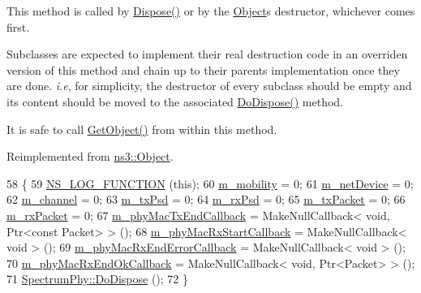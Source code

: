 This method is called by \hyperlink{classns3_1_1Object_aa90ae598863f6c251cdab3c3722afdaf}{Dispose()} or by the \hyperlink{classns3_1_1Object}{Object}\textquotesingle{}s destructor, whichever comes first.

Subclasses are expected to implement their real destruction code in an overriden version of this method and chain up to their parent\textquotesingle{}s implementation once they are done. {\itshape i.\+e}, for simplicity, the destructor of every subclass should be empty and its content should be moved to the associated \hyperlink{classns3_1_1HalfDuplexIdealPhy_a94c4dd0e18bc6c4999d75d65ef80c27e}{Do\+Dispose()} method.

It is safe to call \hyperlink{classns3_1_1Object_a13e18c00017096c8381eb651d5bd0783}{Get\+Object()} from within this method. 

Reimplemented from \hyperlink{classns3_1_1Object_a475d429a75d302d4775f4ae32479b287}{ns3\+::\+Object}.


\begin{DoxyCode}
58 \{
59   \hyperlink{log-macros-disabled_8h_a90b90d5bad1f39cb1b64923ea94c0761}{NS\_LOG\_FUNCTION} (\textcolor{keyword}{this});
60   \hyperlink{classns3_1_1HalfDuplexIdealPhy_a4473d14e6f2ff9983cb9c5eee0b52fe7}{m\_mobility} = 0;
61   \hyperlink{classns3_1_1HalfDuplexIdealPhy_aaa6f5f1e7154d0cd2aada4fd79cdddda}{m\_netDevice} = 0;
62   \hyperlink{classns3_1_1HalfDuplexIdealPhy_a9bb6049f9f9ff30db2f243eef2fe78d8}{m\_channel} = 0;
63   \hyperlink{classns3_1_1HalfDuplexIdealPhy_aec3b3404be2ce3e803e134e27a79aae9}{m\_txPsd} = 0;
64   \hyperlink{classns3_1_1HalfDuplexIdealPhy_a17dfdb0350a690c50953deb78318025e}{m\_rxPsd} = 0;
65   \hyperlink{classns3_1_1HalfDuplexIdealPhy_abdf5e830cf997ebddb20aa057198449e}{m\_txPacket} = 0;
66   \hyperlink{classns3_1_1HalfDuplexIdealPhy_aa1122da72d7425d4bebb0cd65d442db1}{m\_rxPacket} = 0;
67   \hyperlink{classns3_1_1HalfDuplexIdealPhy_a183edd1d401edee88591a819f52f9679}{m\_phyMacTxEndCallback}      = MakeNullCallback< void, Ptr<const Packet> > ();
68   \hyperlink{classns3_1_1HalfDuplexIdealPhy_a708f1a267cb2f0e82b731d7fcd7aee04}{m\_phyMacRxStartCallback}    = MakeNullCallback< void > ();
69   \hyperlink{classns3_1_1HalfDuplexIdealPhy_aa3c7a178ca01aa7ac1408249c9fef3f2}{m\_phyMacRxEndErrorCallback} = MakeNullCallback< void > ();
70   \hyperlink{classns3_1_1HalfDuplexIdealPhy_af5bc7ea034a489c4321bb2d7e12187af}{m\_phyMacRxEndOkCallback}    = MakeNullCallback< void, Ptr<Packet> >  ();
71   \hyperlink{classns3_1_1Object_a475d429a75d302d4775f4ae32479b287}{SpectrumPhy::DoDispose} ();
72 \}
\end{DoxyCode}


